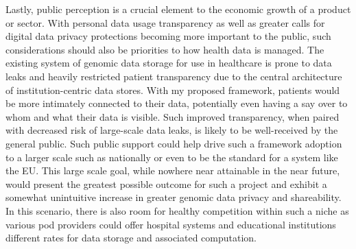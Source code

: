 \documentclass{article}
\begin{document}
Lastly, public perception is a crucial element to the economic growth of a product or sector. With personal data usage transparency as well as greater calls for digital data privacy protections becoming more important to the public, such considerations should also be priorities to how health data is managed. The existing system of genomic data storage for use in healthcare is prone to data leaks and heavily restricted patient transparency due to the central architecture of institution-centric data stores. With my proposed framework, patients would be more intimately connected to their data, potentially even having a say over to whom and what their data is visible. Such improved transparency, when paired with decreased risk of large-scale data leaks, is likely to be well-received by the general public. Such public support could help drive such a framework adoption to a larger scale such as nationally or even to be the standard for a system like the EU. This large scale goal, while nowhere near attainable in the near future, would present the greatest possible outcome for such a project and exhibit a somewhat unintuitive increase in greater genomic data privacy and shareability. In this scenario, there is also room for healthy competition within such a niche as various pod providers could offer hospital systems and educational institutions different rates for data storage and associated computation.


    

\end{document}
